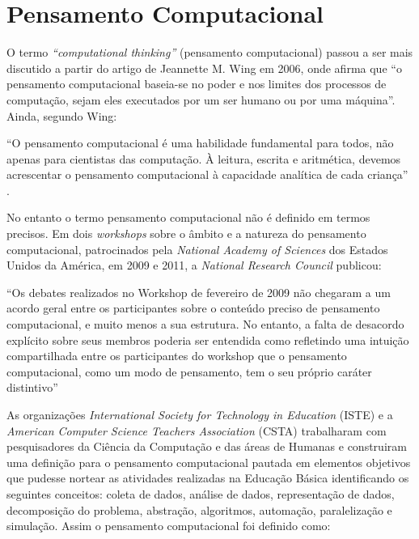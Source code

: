\documentclass[12pt, openright, a4paper, brazil, english, french, spanish, bibjustif, openany, oneside]{abntex2}
\begin{document}
\section{Pensamento Computacional}

O termo \textit{``computational thinking''} (pensamento computacional) passou a ser mais discutido a partir do artigo de Jeannette M. Wing em 2006, onde afirma que ``o pensamento computacional baseia-se no poder e nos limites dos processos de computação, sejam eles executados por um ser humano ou por uma máquina''\cite{wing}. Ainda, segundo Wing:

\begin{citacao}

``O pensamento computacional é uma habilidade fundamental para todos, não apenas para cientistas das computação. À leitura, escrita e aritmética, devemos acrescentar o pensamento computacional à capacidade analítica de cada criança'' \cite{wing}.

\end{citacao}




No entanto o termo pensamento computacional não é definido em termos precisos. Em dois \textit{workshops} sobre o âmbito e a natureza do pensamento computacional, patrocinados pela \textit{National Academy of Sciences} dos Estados Unidos da América, em 2009 e 2011, a \textit{National Research Council} publicou:

\begin{citacao}

``Os debates realizados no Workshop de fevereiro de 2009 não chegaram a um acordo geral entre os participantes sobre o conteúdo preciso de pensamento computacional, e muito menos a sua estrutura. No entanto, a falta de desacordo explícito sobre seus membros poderia ser entendida como refletindo uma intuição compartilhada entre os participantes do workshop que o pensamento computacional, como um modo de pensamento, tem o seu próprio caráter distintivo'' \cite{NRC}

\end{citacao}

As organizações \textit{International Society for Technology in Education} (ISTE) e a \textit{American Computer Science Teachers Association} (CSTA) trabalharam com pesquisadores da Ciência da Computação e das áreas de Humanas e construiram uma definição para o pensamento computacional pautada em elementos objetivos que pudesse nortear as atividades realizadas na Educação Básica identificando os seguintes conceitos: coleta de dados, análise de dados, representação de dados, decomposição do problema, abstração, algoritmos, automação, paralelização e simulação. Assim o pensamento computacional foi definido como:
\end{document}
